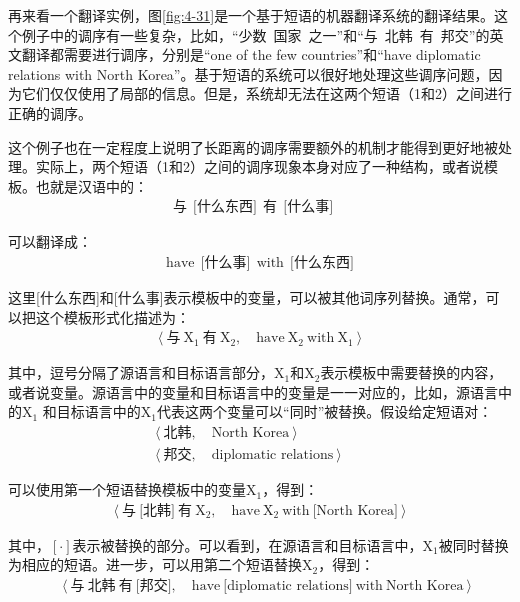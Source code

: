 \parinterval 再来看一个翻译实例\cite{Chiang2012Hope}，图\ref{fig:4-31}是一个基于短语的机器翻译系统的翻译结果。这个例子中的调序有一些复杂，比如，``少数\ 国家\ 之一''和``与\ 北韩\ 有\ 邦交''的英文翻译都需要进行调序，分别是``one of the few countries''和``have diplomatic relations with North Korea''。基于短语的系统可以很好地处理这些调序问题，因为它们仅仅使用了局部的信息。但是，系统却无法在这两个短语（1和2）之间进行正确的调序。

\parinterval 这个例子也在一定程度上说明了长距离的调序需要额外的机制才能得到更好地被处理。实际上，两个短语（1和2）之间的调序现象本身对应了一种结构，或者说模板。也就是汉语中的：
\begin{eqnarray}
\text{与}\ \ \text{[什么东西]}\ \ \text{有}\ \ \text{[什么事]} \quad \nonumber
\end{eqnarray}

\parinterval 可以翻译成：
\begin{eqnarray}
\textrm{have}\ \ \text{[什么事]}\ \ \textrm{with}\ \ \text{[什么东西]} \nonumber
\end{eqnarray}

\parinterval 这里[什么东西]和[什么事]表示模板中的变量，可以被其他词序列替换。通常，可以把这个模板形式化描述为：
\begin{eqnarray}
\langle \ \text{与}\ \textrm{X}_1\ \text{有}\ \textrm{X}_2,\quad \textrm{have}\ \textrm{X}_2\ \textrm{with}\ \textrm{X}_1\ \rangle \nonumber
\end{eqnarray}

\noindent 其中，逗号分隔了源语言和目标语言部分，$\textrm{X}_1$和$\textrm{X}_2$表示模板中需要替换的内容，或者说变量。源语言中的变量和目标语言中的变量是一一对应的，比如，源语言中的$\textrm{X}_1$ 和目标语言中的$\textrm{X}_1$代表这两个变量可以``同时''被替换。假设给定短语对：
\begin{eqnarray}
\langle \ \text{北韩},\quad \textrm{North Korea} \ \rangle \qquad\ \quad\quad\ \  \nonumber \\
\langle \ \text{邦交},\quad \textrm{diplomatic relations} \ \rangle\quad\ \ \ \nonumber
\end{eqnarray}

\parinterval 可以使用第一个短语替换模板中的变量$\textrm{X}_1$，得到：
\begin{eqnarray}
\langle \ \text{与}\ \text{[北韩]}\ \text{有}\ \textrm{X}_2,\quad \textrm{have}\ \textrm{X}_2\ \textrm{with}\ \textrm{[North Korea]} \ \rangle \nonumber
\end{eqnarray}

\noindent 其中，$[\cdot]$表示被替换的部分。可以看到，在源语言和目标语言中，$\textrm{X}_1$被同时替换为相应的短语。进一步，可以用第二个短语替换$\textrm{X}_2$，得到：
\begin{eqnarray}
\quad\langle \ \text{与}\ \text{北韩}\ \text{有}\ \text{[邦交]},\quad \textrm{have}\ \textrm{[diplomatic relations]}\ \textrm{with}\ \textrm{North Korea} \ \rangle \nonumber
\end{eqnarray}

